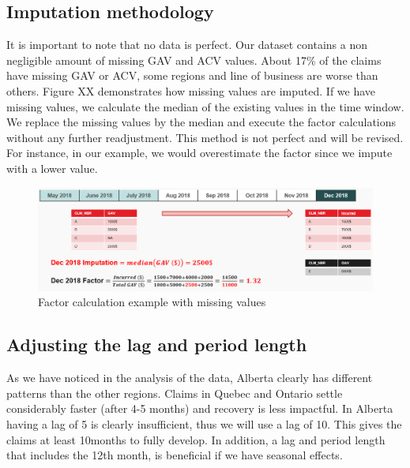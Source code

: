 \subsection{Imputation methodology}
	It is important to note that no data is perfect. Our dataset contains a non negligible amount of missing GAV and ACV values. About 17\% of the claims have missing GAV or ACV, some regions and line of business are worse than others. Figure XX demonstrates how missing values are imputed. If we have missing values, we calculate the median of the existing values in the time window. We replace the missing values by the median and execute the factor calculations without any further readjustment. This method is not perfect and will be revised. For instance, in our example, we would overestimate the factor since we impute with a lower value.  
	\begin{figure}[H]
		\begin{center}
			\includegraphics[scale=0.4]{Graphiques/imputation_example} 
			\renewcommand{\figurename}{Figure}
			\caption{Factor calculation example with missing values}\label{Fig_imputation_example}
		\end{center}
	\end{figure}

\subsection{Adjusting the lag and period length}
As we have noticed in the analysis of the data, Alberta clearly has different patterns than the other regions. Claims in Quebec and Ontario settle considerably faster (after 4-5 months) and recovery is less impactful. In Alberta having a lag of 5 is clearly insufficient, thus we will use a lag of 10. This gives the claims at least 10months to fully develop. In addition, a lag and period length that includes the 12th month, is beneficial if we have seasonal effects.
